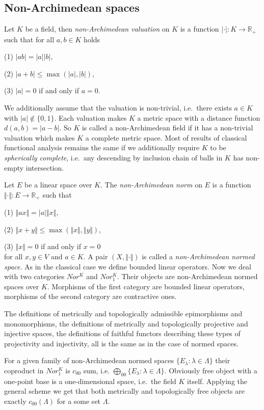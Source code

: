 \documentclass[a0b,landscape]{a0poster}
\begin{document}
\begin{multicols}{4}
\section*{Non-Archimedean spaces}

Let $K$ be a field, then \textit{non-Archimedean valuation} on $K$ is a function
$|\cdot|:K\to \mathbb{R}_+$ such that for all $a,b\in K$ holds

(1) $|ab|=|a||b|$,

(2) $|a+b|\leq\max(|a|,|b|)$,

(3) $|a|=0$ if and only if $a=0$.

We additionally assume that the valuation is non-trivial, i.e.~there exists
$a\in K$ with $|a|\notin \{0,1 \}$. Each valuation makes $K$ a metric space
with a distance function $d(a,b)=|a-b|$. So $K$ is called a non-Archimedean
field if it has a non-trivial valuation which makes $K$ a complete metric space.
Most of results of classical functional analysis remains the same if we
additionally require $K$ to be \textit{spherically complete}, i.e.~any
descending by inclusion chain of balls in $K$ has non-empty intersection.

Let $E$ be a linear space over $K$. The \textit{non-Archimedean norm} on $E$ is
a function $\Vert\cdot\Vert:E\to\mathbb{R}_+$ such that

(1) $\Vert a x\Vert=|a|\Vert x\Vert$,

(2) $\Vert x+y\Vert\leq\max(\Vert x\Vert,\Vert y\Vert)$,

(3) $\Vert x\Vert=0$ if and only if $x=0$ \\
for all $x,y\in V$ and $a\in K$. A pair $(X,\Vert\cdot\Vert)$ is called a
\textit{non-Archimedean normed space}. As in the classical case we define
bounded linear operators. Now we deal with two categories $Nor^K$ and $Nor^K_1$.
Their objects are non-Archimedean normed spaces over $K$. Morphisms of the first
category are bounded linear operators, morphisms of the second category are
contractive ones.

The definitions of metrically and topologically admissible epimorphisms and
monomorphisms, the definitions of metrically and topologically projective and
injective spaces, the definitions of faithful functors describing these types of
projectivity and injectivity, all is the same as in the case of normed spaces.

For a given family of non-Archimedean normed spaces $\{E_ \lambda : \lambda \in
\Lambda \}$ their coproduct in $Nor_1^K$ is $c_{00}$ sum, i.e.
$\bigoplus_{00}\{E_ \lambda : \lambda \in \Lambda \}$. Obviously free object with
a one-point base is a one-dimensional space, i.e.~the field $K$ itself.
Applying the general scheme we get that both metrically and topologically free
objects are exactly $c_{00}(\Lambda)$ for a some set $\Lambda$.



\end{multicols}
\end{document}

